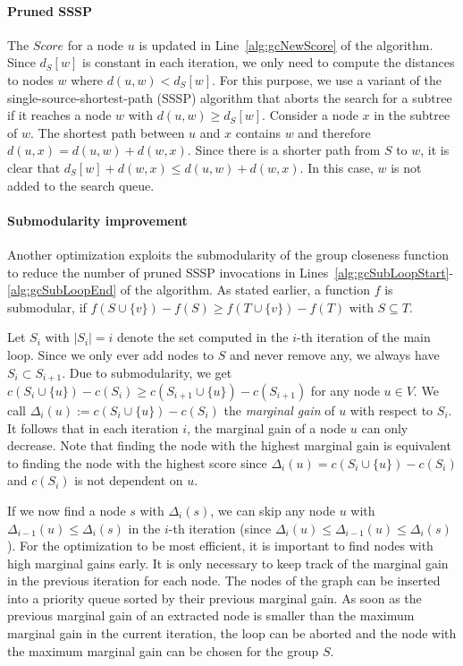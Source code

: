 \paragraph{Pruned SSSP}
The $Score$ for a node $u$ is updated in Line~\ref{alg:gcNewScore} of the algorithm. Since $d_S[w]$ is constant in each iteration, we only need to compute the distances to nodes $w$ where $d(u, w) < d_S[w]$. For this purpose, we use a variant of the single-source-shortest-path (SSSP) algorithm that aborts the search for a subtree if it reaches a node $w$ with $d(u, w) \geq d_S[w]$. Consider a node $x$ in the subtree of $w$. The shortest path between $u$ and $x$ contains $w$ and therefore $d(u, x) = d(u, w) + d(w, x)$. Since there is a shorter path from $S$ to $w$, it is clear that $d_S[w] + d(w, x) \leq d(u, w) + d(w, x)$. In this case, $w$ is not added to the search queue.

\paragraph{Submodularity improvement}
Another optimization exploits the submodularity of the group closeness function to reduce the number of pruned SSSP invocations in Lines~\ref{alg:gcSubLoopStart}-\ref{alg:gcSubLoopEnd} of the algorithm. As stated earlier, a function $f$ is submodular, if $f(S \cup \{v\}) - f(S) \geq f(T \cup \{v\}) - f(T)$ with $S \subseteq T$.

Let $S_i$ with $|S_i| = i$ denote the set computed in the $i$-th iteration of the main loop. Since we only ever add nodes to $S$ and never remove any, we always have $S_i \subset S_{i + 1}$. Due to submodularity, we get $c(S_i \cup \{u\}) - c(S_i) \geq c(S_{i + 1} \cup \{u\}) - c(S_{i + 1})$ for any node $u \in V$. We call $\Delta_i(u) := c(S_i \cup \{u\}) - c(S_i)$ the \emph{marginal gain} of $u$ with respect to $S_i$. It follows that in each iteration $i$, the marginal gain of a node $u$ can only decrease. Note that finding the node with the highest marginal gain is equivalent to finding the node with the highest score since $\Delta_i(u) = c(S_i \cup \{u\}) - c(S_i)$ and $c(S_i)$ is not dependent on $u$.

If we now find a node $s$ with $\Delta_i(s)$, we can skip any node $u$ with $\Delta_{i - 1}(u) \leq \Delta_i(s)$ in the $i$-th iteration (since $\Delta_{i}(u) \leq \Delta_{i - 1}(u) \leq \Delta_i(s)$). For the optimization to be most efficient, it is important to find nodes with high marginal gains early. It is only necessary to keep track of the marginal gain in the previous iteration for each node. The nodes of the graph can be inserted into a priority queue sorted by their previous marginal gain. As soon as the previous marginal gain of an extracted node is smaller than the maximum marginal gain in the current iteration, the loop can be aborted and the node with the maximum marginal gain can be chosen for the group $S$.


